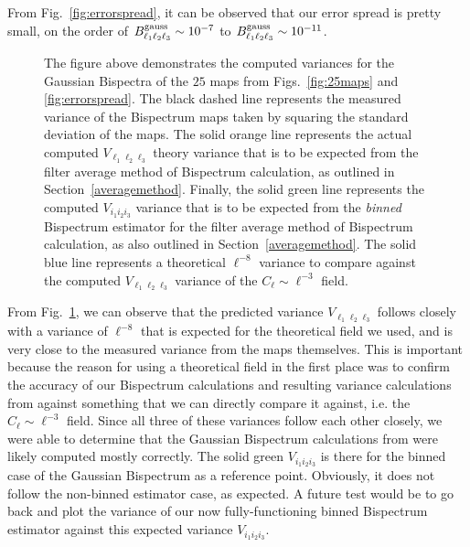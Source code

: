 \documentclass[11pt]{article}
\renewcommand{\_}[1]{\underline{ #1 }}
\begin{document}
{From Fig.~\ref{fig:errorspread}, it can be observed that our error spread is pretty small, on the order of $B^{\rm gauss}_{\ell_1 \ell_2 \ell_3} \sim 10^{-7}$ to  $B^{\rm gauss}_{\ell_1 \ell_2 \ell_3} \sim 10^{-11}$.

\begin{figure}[H]
    \centering
    \caption{The figure above demonstrates the computed variances for the Gaussian Bispectra of the $25$ maps from Figs.~\ref{fig:25maps} and \ref{fig:errorspread}. The black dashed line represents the measured variance of the Bispectrum maps taken by squaring the standard deviation of the maps. The solid orange line represents the actual computed $V_{\ell_1 \ell_2 \ell_3}$ theory variance that is to be expected from the filter average method of Bispectrum calculation, as outlined in Section~\ref{averagemethod}. Finally, the solid green line represents the computed $V_{i_1 i_2 i_3}$ variance that is to be expected from the \textit{binned} Bispectrum estimator for the filter average method of Bispectrum calculation, as also outlined in Section~\ref{averagemethod}. The solid blue line represents a theoretical $\ell^{-8}$ variance to compare against the computed $V_{\ell_1 \ell_2 \ell_3}$ variance of the $C_{\ell} \sim \ell^{-3}$ field.}\label{fig:variance}
\end{figure}

From Fig.~\ref{fig:variance}, we can observe that the predicted variance $V_{\ell_1 \ell_2 \ell_3}$ follows closely with a variance of $\ell^{-8}$ that is expected for the theoretical field we used, and is very close to the measured variance from the maps themselves. This is important because the reason for using a theoretical field in the first place was to confirm the accuracy of our Bispectrum calculations and resulting variance calculations from \cite{Munshi_2020} against something that we can directly compare it against, i.e. the $C_{\ell} \sim \ell^{-3}$ field. Since all three of these variances follow each other closely, we were able to determine that the Gaussian Bispectrum calculations from \cite{Munshi_2020} were likely computed mostly correctly. The solid green $V_{i_1 i_2 i_3}$ is there for the binned case of the Gaussian Bispectrum as a reference point. Obviously, it does not follow the non-binned estimator case, as expected. A future test would be to go back and plot the variance of our now fully-functioning binned Bispectrum estimator against this expected variance $V_{i_1 i_2 i_3}$.

}
\end{document}
